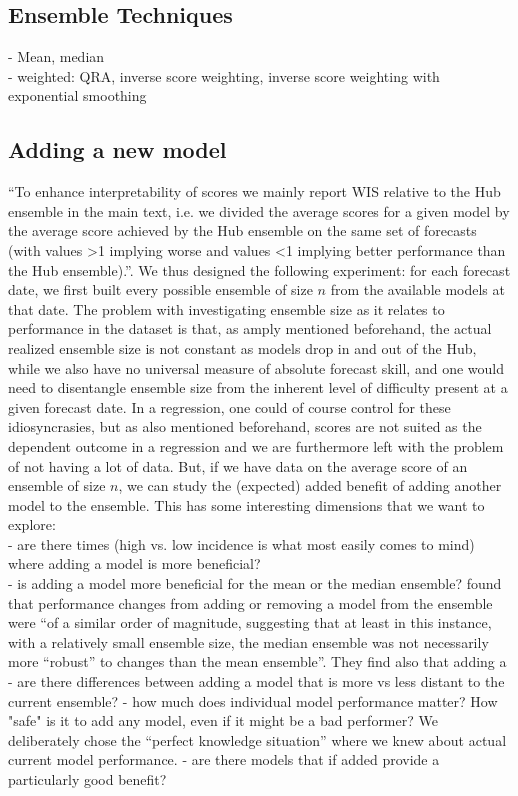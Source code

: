 \subsection{Ensemble Techniques}
- Mean, median \\
- weighted: QRA, inverse score weighting, inverse score weighting with exponential smoothing
\subsection{Adding a new model}
``To enhance
interpretability of scores we mainly report WIS relative to the Hub ensemble in the main text, i.e. we divided
the average scores for a given model by the average score achieved by the Hub ensemble on the same set of
forecasts (with values >1 implying worse and values <1 implying better performance than the Hub ensemble).''\cite{bosse_comparing_2021-1}.
We thus designed the following experiment: for each forecast date, we first built every possible ensemble of size $n$ from the available models at that date. The problem with investigating ensemble size as it relates to performance in the dataset is that, as amply mentioned beforehand, the actual realized ensemble size is not constant as models drop in and out of the Hub, while we also have no universal measure of absolute forecast skill, and one would need to disentangle ensemble size from the inherent level of difficulty present at a given forecast date. In a regression, one could of course control for these idiosyncrasies, but as also mentioned beforehand, scores are not suited as the dependent outcome in a regression and we are furthermore left with the problem of not having a lot of data. But, if we have data on the average score of an ensemble of size $n$, we can study the (expected) added benefit of adding another model to the ensemble. This has some interesting dimensions that we want to explore:\\
- are there times (high vs. low incidence is what most easily comes to mind) where adding a model is more beneficial?\\
- is adding a model more beneficial for the mean or the median ensemble? \cite{bosse_comparing_2021-1} found that performance changes from adding or removing a model from the ensemble were ``of a similar order of magnitude, suggesting that at least in this instance, with a relatively small ensemble size, the median ensemble was not necessarily more ``robust'' to changes than the mean ensemble''. They find also that adding a 
- are there differences between adding a model that is more vs less distant to the current ensemble?
- how much does individual model performance matter? How "safe" is it to add any model, even if it might be a bad performer? We deliberately chose the ``perfect knowledge situation'' where we knew about actual current model performance. 
- are there models that if added provide a particularly good benefit?


